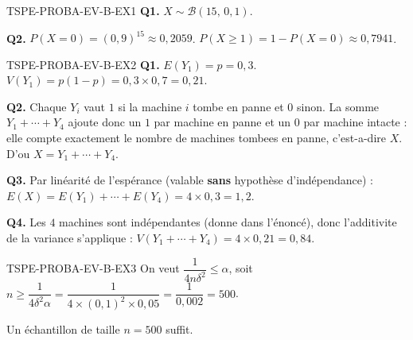 %
\begin{corrige}{TSPE-PROBA-EV-B-EX1}
\textbf{Q1.} $X \sim \mathcal{B}(15,\,0{,}1)$.

\textbf{Q2.} $P(X=0) = (0{,}9)^{15} \approx 0{,}2059$. $P(X\geq1) = 1-P(X=0) \approx \boxed{0{,}7941}$.
\end{corrige}

\begin{corrige}{TSPE-PROBA-EV-B-EX2}
\textbf{Q1.} $E(Y_1)=p=0{,}3$. $V(Y_1)=p(1-p)=0{,}3\times0{,}7=0{,}21$.

\textbf{Q2.} Chaque $Y_i$ vaut $1$ si la machine $i$ tombe en panne et $0$ sinon. La somme $Y_1+\cdots+Y_4$ ajoute donc un $1$ par machine en panne et un $0$ par machine intacte : elle compte exactement le nombre de machines tombees en panne, c'est-a-dire $X$. D'ou $X=Y_1+\cdots+Y_4$.

\textbf{Q3.} Par linéarité de l'espérance (valable \textbf{sans} hypothèse d'indépendance) : $E(X)=E(Y_1)+\cdots+E(Y_4) = 4\times0{,}3 = \boxed{1{,}2}$.

\textbf{Q4.} Les $4$ machines sont indépendantes (donne dans l'énoncé), donc l'additivite de la variance s'applique : $V(Y_1+\cdots+Y_4) = 4\times0{,}21 = \boxed{0{,}84}$.
\end{corrige}

\begin{corrige}{TSPE-PROBA-EV-B-EX3}
On veut $\dfrac{1}{4n\delta^2} \leq \alpha$, soit $n \geq \dfrac{1}{4\delta^2\alpha} = \dfrac{1}{4\times(0{,}1)^2\times0{,}05} = \dfrac{1}{0{,}002} = 500$.

Un échantillon de taille $\boxed{n=500}$ suffit.
\end{corrige}
